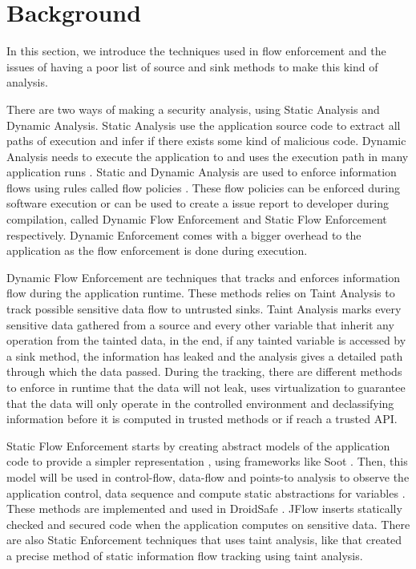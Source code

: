 \chapter{Background}\label{chapter:background}

In this section, we introduce the techniques used in flow enforcement and the issues of having a poor list of source and sink methods to make this kind of analysis.

There are two ways of making a security analysis, using Static Analysis and Dynamic Analysis. Static Analysis use the application source code to extract all paths of execution and infer if there exists some kind of malicious code. Dynamic Analysis needs to execute the application to and uses the execution path in many application runs \citep{tam2017evolution}. Static and Dynamic Analysis are used to enforce information flows using rules called flow policies \citep{fernandes2016flowfence}. These flow policies can be enforced during software execution or can be used to create a issue report to developer during compilation, called Dynamic Flow Enforcement and Static Flow Enforcement respectively. Dynamic Enforcement comes with a bigger overhead to the application as the flow enforcement is done during execution.

Dynamic Flow Enforcement are techniques that tracks and enforces information flow during the application runtime. These methods relies on Taint Analysis to track possible sensitive data flow to untrusted sinks. Taint Analysis marks every sensitive data gathered from a source and every other variable that inherit any operation from the tainted data, in the end, if any tainted variable is accessed by a sink method, the information has leaked and the analysis gives a detailed path through which the data passed. During the tracking, there are different methods to enforce in runtime that the data will not leak, \cite{fernandes2016flowfence} uses virtualization to guarantee that the data will only operate in the controlled environment and \cite{sun2017data} declassifying information before it is computed in trusted methods or if reach a trusted API.

Static Flow Enforcement starts by creating abstract models of the application code to provide a simpler representation \citep{myers1999jflow}, using frameworks like Soot \citep{vallee2000optimizing}. Then, this model will be used in control-flow, data-flow and points-to analysis to observe the application control, data sequence and compute static abstractions for variables \cite{li2017static}. These methods are implemented and used in DroidSafe \cite{gordon2015information}. JFlow \cite{myers1999jflow} inserts statically checked and secured code when the application computes on sensitive data. There are also Static Enforcement techniques that uses taint analysis, like \cite{arzt2014flowdroid} that created a precise method of static information flow tracking using taint analysis.

